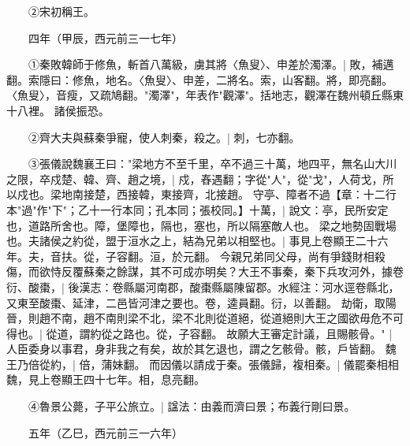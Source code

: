 　　②宋初稱王。

　　四年（甲辰，西元前三一七年）

　　①秦敗韓師于修魚，斬首八萬級，虜其將〈魚叟〉、申差於濁澤。|{
	敗，補邁翻。索隱曰：修魚，地名。〈魚叟〉、申差，二將名。索，山客翻。將，即亮翻。〈魚叟〉，音瘦，又疏鳩翻。"濁澤"，年表作"觀澤"。括地志，觀澤在魏州頓丘縣東十八裡。
	}
諸侯振恐。

　　②齊大夫與蘇秦爭寵，使人刺秦，殺之。|{
	刺，七亦翻。
	}

　　③張儀說魏襄王曰："梁地方不至千里，卒不過三十萬，地四平，無名山大川之限，卒戍楚、韓、齊、趙之境，|{
	戍，舂遇翻；字從"人"，從"戈"，人荷戈，所以戍也。梁地南接楚，西接韓，東接齊，北接趙。
	}
守亭、障者不過【章：十二行本"過"作"下"；乙十一行本同；孔本同；張校同。】十萬，|{
	說文：亭，民所安定也，道路所舍也。障，堡障也，隔也，塞也，所以隔塞敵人也。
	}
梁之地勢固戰場也。夫諸侯之約從，盟于洹水之上，結為兄弟以相堅也。|{
	事見上卷顯王二十六年。夫，音扶。從，子容翻。洹，於元翻。
	}
今親兄弟同父母，尚有爭錢財相殺傷，而欲恃反覆蘇秦之餘謀，其不可成亦明矣？大王不事秦，秦下兵攻河外，據卷衍、酸棗，|{
	後漢志：卷縣屬河南郡，酸棗縣屬陳留郡。水經注：河水逕卷縣北，又東至酸棗、延津，二邑皆河津之要也。卷，逵員翻。衍，以善翻。
	}
劫衛，取陽晉，則趙不南，趙不南則梁不北，梁不北則從道絕，從道絕則大王之國欲毋危不可得也。|{
	從道，謂約從之路也。從，子容翻。
	}
故願大王審定計議，且賜骸骨。" |{
	人臣委身以事君，身非我之有矣，故於其乞退也，謂之乞骸骨。骸，戶皆翻。
	}
魏王乃倍從約，|{
	倍，蒲妹翻。
	}
而因儀以請成于秦。張儀歸，複相秦。|{
	儀罷秦相相魏，見上卷顯王四十七年。相，息亮翻。
	}

　　④魯景公薨，子平公旅立。|{
	諡法：由義而濟曰景；布義行剛曰景。
	}

　　五年（乙巳，西元前三一六年）


